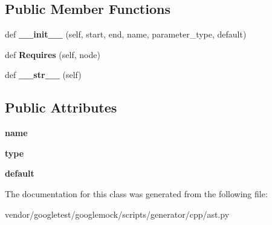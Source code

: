 \subsection*{Public Member Functions}
\begin{DoxyCompactItemize}
\item 
\mbox{\label{classcpp_1_1ast_1_1_parameter_a4fe27f559d44adac9e9b5898ba76c5b3}} 
def {\bfseries \+\_\+\+\_\+init\+\_\+\+\_\+} (self, start, end, name, parameter\+\_\+type, default)
\item 
\mbox{\label{classcpp_1_1ast_1_1_parameter_a4bc5c17a0d606d35be40cb4c2c1a67a6}} 
def {\bfseries Requires} (self, node)
\item 
\mbox{\label{classcpp_1_1ast_1_1_parameter_aabfbabb3c744a0da4a012ceb4299947a}} 
def {\bfseries \+\_\+\+\_\+str\+\_\+\+\_\+} (self)
\end{DoxyCompactItemize}
\subsection*{Public Attributes}
\begin{DoxyCompactItemize}
\item 
\mbox{\label{classcpp_1_1ast_1_1_parameter_aae0375fb0ded8fa9090feea6bdff2784}} 
{\bfseries name}
\item 
\mbox{\label{classcpp_1_1ast_1_1_parameter_a5eed090000c41551a10c21f175ad33e3}} 
{\bfseries type}
\item 
\mbox{\label{classcpp_1_1ast_1_1_parameter_a4ceae2ac87d82c5542c4e7385eb4c97e}} 
{\bfseries default}
\end{DoxyCompactItemize}


The documentation for this class was generated from the following file\+:\begin{DoxyCompactItemize}
\item 
vendor/googletest/googlemock/scripts/generator/cpp/ast.\+py\end{DoxyCompactItemize}
